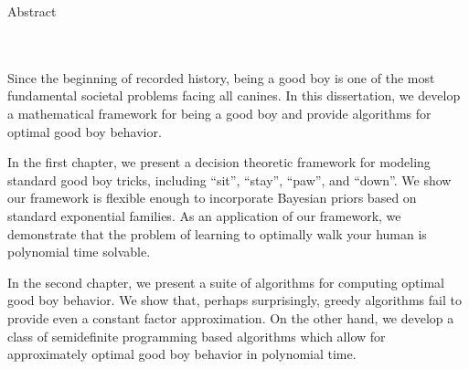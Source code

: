 \begin{center}
    Abstract\\
    \DissertationTitle{}\\
    \AuthorName{}\\
    \DissertationYear{}
\end{center}

\begin{spacing}{2}
	
Since the beginning of recorded history, being a good boy is one of the most fundamental societal problems facing all canines.
In this dissertation, we develop a mathematical framework for being a good boy and provide algorithms for optimal good boy behavior.

In the first chapter, we present a decision theoretic framework for modeling standard good boy tricks, including ``sit'', ``stay'', ``paw'', and ``down''.
We show our framework is flexible enough to incorporate Bayesian priors based on standard exponential families.
As an application of our framework, we demonstrate that the problem of learning to optimally walk your human is polynomial time solvable.

In the second chapter, we present a suite of algorithms for computing optimal good boy behavior.
We show that, perhaps surprisingly, greedy algorithms fail to provide even a constant factor approximation.
On the other hand, we develop a class of semidefinite programming based algorithms which allow for approximately optimal good boy behavior in polynomial time.
	 

\end{spacing}

